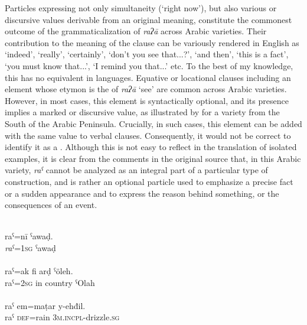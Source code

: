 \documentclass[output=paper]{langsci/langscibook}
\begin{document}
Particles expressing not only simultaneity (‘right now’), but also various  or discursive values derivable from an original  meaning, constitute the commonest outcome of the grammaticalization of \textit{raʔā} across Arabic varieties. Their contribution to the meaning of the clause can be variously rendered in English as ‘indeed’, ‘really’, ‘certainly’, ‘don’t you see that...?’, ‘and then’, ‘this is a fact’, ‘you must know that...’, ‘I remind you that...’ etc. To the best of my knowledge, this  has no equivalent in  languages.
Equative or locational clauses including an element whose etymon is the  of \textit{raʔā} ‘see’ are common across Arabic varieties. However, in most cases, this element is syntactically optional, and its presence implies a marked  or discursive value, as illustrated by  for a variety from the South of the Arabic Peninsula. Crucially, in such cases, this element can be added with the same value to verbal clauses. Consequently, it would not be correct to identify it as a . Although this is not easy to reflect in the translation of isolated examples, it is clear from the comments in the original source that, in this Arabic variety, \textit{raˁ} cannot be analyzed as an integral part of a particular type of  construction, and is rather an optional particle used to emphasize a precise fact or a sudden appearance and to express the reason behind something, or the consequences of an event.

  \ea
    \label{ex:creissels:10}
\\  
\ea
    \gll   raˁ=nī  ˁawaḍ.\\
       \textit{raˁ}=\textsc{1sg}  ˁawaḍ\\
      \\
   \ex
    \gll   raˁ=ak  fi  arḍ  ˁöleh.\\
       {raˁ}=\textsc{2sg}  in  country  ˁOlah\\
      \\ 
   \ex
    \gll   raˁ  em=maṭar  y-ehđil.\\
       {raˁ}  \textsc{def}=rain  \textsc{3m.incpl}-drizzle.\textsc{sg}\\
      \\
\z
\z
\end{document}
